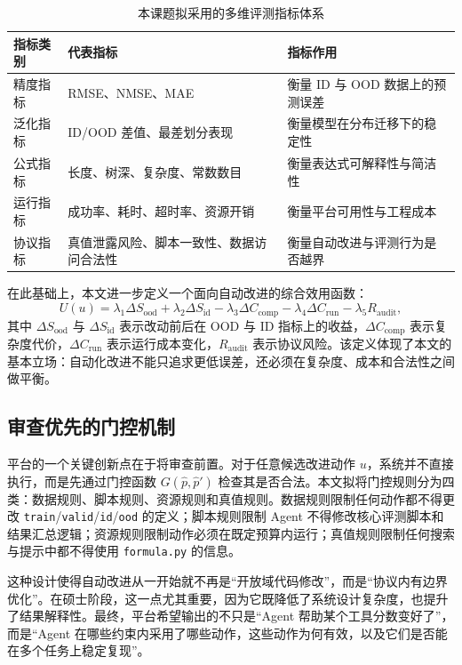 \documentclass[UTF8,12pt]{ctexart}
\begin{document}
\begin{table}[H]
\centering
\begin{tabular}{p{2.6cm}p{4.2cm}p{6.0cm}}
\toprule
指标类别 & 代表指标 & 指标作用 \\
\midrule
精度指标 & RMSE、NMSE、MAE & 衡量 ID 与 OOD 数据上的预测误差 \\
泛化指标 & ID/OOD 差值、最差划分表现 & 衡量模型在分布迁移下的稳定性 \\
公式指标 & 长度、树深、复杂度、常数数目 & 衡量表达式可解释性与简洁性 \\
运行指标 & 成功率、耗时、超时率、资源开销 & 衡量平台可用性与工程成本 \\
协议指标 & 真值泄露风险、脚本一致性、数据访问合法性 & 衡量自动改进与评测行为是否越界 \\
\bottomrule
\end{tabular}
\caption{本课题拟采用的多维评测指标体系}
\label{tab:metric-system}
\end{table}

在此基础上，本文进一步定义一个面向自动改进的综合效用函数：
\[
U(u) = \lambda_1 \Delta S_{\text{ood}} + \lambda_2 \Delta S_{\text{id}} - \lambda_3 \Delta C_{\text{comp}} - \lambda_4 \Delta C_{\text{run}} - \lambda_5 R_{\text{audit}},
\]
其中 $\Delta S_{\text{ood}}$ 与 $\Delta S_{\text{id}}$ 表示改动前后在 OOD 与 ID 指标上的收益，$\Delta C_{\text{comp}}$ 表示复杂度代价，$\Delta C_{\text{run}}$ 表示运行成本变化，$R_{\text{audit}}$ 表示协议风险。该定义体现了本文的基本立场：自动化改进不能只追求更低误差，还必须在复杂度、成本和合法性之间做平衡。

\subsection{审查优先的门控机制}

平台的一个关键创新点在于将审查前置。对于任意候选改进动作 $u$，系统并不直接执行，而是先通过门控函数 $G(\hat{p},\hat{p}')$ 检查其是否合法。本文拟将门控规则分为四类：数据规则、脚本规则、资源规则和真值规则。数据规则限制任何动作都不得更改 \texttt{train}/\texttt{valid}/\texttt{id}/\texttt{ood} 的定义；脚本规则限制 Agent 不得修改核心评测脚本和结果汇总逻辑；资源规则限制动作必须在既定预算内运行；真值规则限制任何搜索与提示中都不得使用 \texttt{formula.py} 的信息。

这种设计使得自动改进从一开始就不再是“开放域代码修改”，而是“协议内有边界优化”。在硕士阶段，这一点尤其重要，因为它既降低了系统设计复杂度，也提升了结果解释性。最终，平台希望输出的不只是“Agent 帮助某个工具分数变好了”，而是“Agent 在哪些约束内采用了哪些动作，这些动作为何有效，以及它们是否能在多个任务上稳定复现”。
\end{document}
